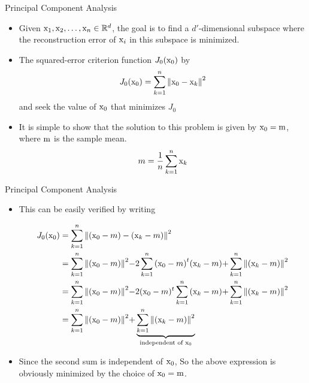 \begin{frame}{Principal Component Analysis}
\begin{itemize}
\item Given ${\rm x}_1,{\rm x}_2,\ldots,{\rm x}_n\in \mathbb{R}^d$, the goal is to find a $d'$-dimensional subspace where the reconstruction error of ${\rm x}_i$ in this subspace is minimized.
\item The squared-error criterion function $J_0({\rm x}_0)$ by
\begin{equation}
{J_0}({{\rm x}_0}) = \sum\limits_{k = 1}^n {{{\left\| {{{\rm x}_0} - {{\rm x}_k}} \right\|}^2}} \nonumber
\end{equation}
and seek the value of ${\rm x}_0$ that minimizes $J_0$
\item It is simple to show that the solution to this problem is given by ${\rm x}_0={\rm m}$, where ${\rm m}$ is the sample mean.
\begin{equation}
m = \frac{1}{n}\sum\limits_{k = 1}^n {{{\rm x}_k}}\nonumber
\end{equation}
\end{itemize}
\end{frame}

\begin{frame}{Principal Component Analysis}
\begin{itemize}
\item This can be easily verified by writing
\begin{footnotesize}
\begin{align}
{J_0}({{\rm x}_0}) &= \sum\limits_{k = 1}^n {{{\left\| {({{\rm x}_0} - m) - ({{\rm x}_k} - m)} \right\|}^2}} \nonumber\\
& = \sum\limits_{k = 1}^n {{{\left\| {({{\rm x}_0} - m)} \right\|}^2} - } 2\sum\limits_{k = 1}^n {{{({{\rm x}_0} - m)}^t}({{\rm x}_k} - m) + } \sum\limits_{k = 1}^n {{{\left\| {({{\rm x}_k} - m)} \right\|}^2}} \nonumber\\
& = \sum\limits_{k = 1}^n {{{\left\| {({{\rm x}_0} - m)} \right\|}^2} - } 2{({{\rm x}_0} - m)^t}\sum\limits_{k = 1}^n {({{\rm x}_k} - m) + } \sum\limits_{k = 1}^n {{{\left\| {({{\rm x}_k} - m)} \right\|}^2}} \nonumber\\
& = \sum\limits_{k = 1}^n {{{\left\| {({{\rm x}_0} - m)} \right\|}^2} + } \underbrace {\sum\limits_{k = 1}^n {{{\left\| {({{\rm x}_k} - m)} \right\|}^2}} }_{\text{independent of }{{\rm x}_0}}\nonumber
\end{align}
\end{footnotesize}
\item Since the second sum is independent of ${\rm x_0}$, So the above expression is obviously minimized by the choice of ${\rm x}_0={\rm m}$.
\end{itemize}
\end{frame}

